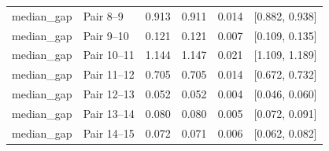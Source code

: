 \begin{tabular}{llllll}
median\_gap & Pair 8--9 & 0.913 & 0.911 & 0.014 & [0.882, 0.938] \\
median\_gap & Pair 9--10 & 0.121 & 0.121 & 0.007 & [0.109, 0.135] \\
median\_gap & Pair 10--11 & 1.144 & 1.147 & 0.021 & [1.109, 1.189] \\
median\_gap & Pair 11--12 & 0.705 & 0.705 & 0.014 & [0.672, 0.732] \\
median\_gap & Pair 12--13 & 0.052 & 0.052 & 0.004 & [0.046, 0.060] \\
median\_gap & Pair 13--14 & 0.080 & 0.080 & 0.005 & [0.072, 0.091] \\
median\_gap & Pair 14--15 & 0.072 & 0.071 & 0.006 & [0.062, 0.082] \\
\bottomrule
\end{tabular}
